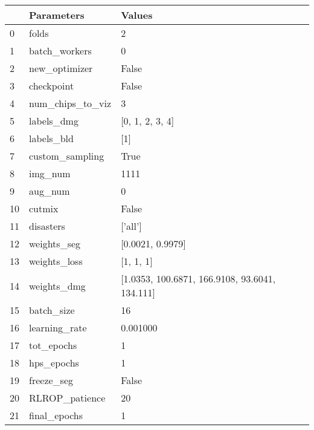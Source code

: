 \begin{tabular}{lll}
\toprule
 & Parameters & Values \\
\midrule
0 & folds & 2 \\
1 & batch_workers & 0 \\
2 & new_optimizer & False \\
3 & checkpoint & False \\
4 & num_chips_to_viz & 3 \\
5 & labels_dmg & [0, 1, 2, 3, 4] \\
6 & labels_bld & [1] \\
7 & custom_sampling & True \\
8 & img_num & 1111 \\
9 & aug_num & 0 \\
10 & cutmix & False \\
11 & disasters & ['all'] \\
12 & weights_seg & [0.0021, 0.9979] \\
13 & weights_loss & [1, 1, 1] \\
14 & weights_dmg & [1.0353, 100.6871, 166.9108, 93.6041, 134.111] \\
15 & batch_size & 16 \\
16 & learning_rate & 0.001000 \\
17 & tot_epochs & 1 \\
18 & hps_epochs & 1 \\
19 & freeze_seg & False \\
20 & RLROP_patience & 20 \\
21 & final_epochs & 1 \\
\bottomrule
\end{tabular}
